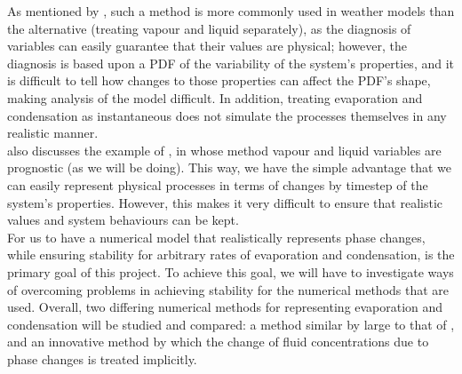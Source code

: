 \documentclass[11pt]{article}
\begin{document}
As mentioned by \citeauthor{Wilson2008}, such a method is more commonly used in weather models than the alternative (treating vapour and liquid separately), as the diagnosis of variables can easily guarantee that their values are physical; however, the diagnosis is based upon a PDF of the variability of the system's properties, and it is difficult to tell how changes to those properties can affect the PDF's shape, making analysis of the model difficult. In addition, treating evaporation and condensation as instantaneous does not simulate the processes themselves in any realistic manner. \\
\citeauthor{Wilson2008} also discusses the example of \citet{Tiedtke1993}, in whose method vapour and liquid variables are prognostic (as we will be doing). This way, we have the simple advantage that we can easily represent physical processes in terms of changes by timestep of the system's properties. However, this makes it very difficult to ensure that realistic values and system behaviours can be kept. \\
For us to have a numerical model that realistically represents phase changes, while ensuring stability for arbitrary rates of evaporation and condensation, is the primary goal of this project. To achieve this goal, we will have to investigate ways of overcoming problems in achieving stability for the numerical methods that are used. Overall, two differing numerical methods for representing evaporation and condensation will be studied and compared: a method similar by large to that of \citet{Tiedtke1993}, and an innovative method by which the change of fluid concentrations due to phase changes is treated implicitly.
\end{document}
